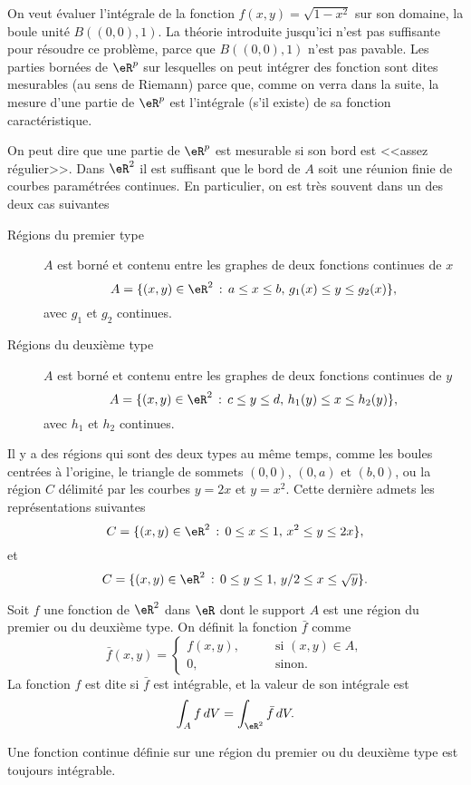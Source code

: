 On veut évaluer l'intégrale de la fonction $f(x,y)=\sqrt{1-x^2}$ sur son domaine, la boule unité $B((0,0),1)$. La théorie introduite jusqu'ici n'est pas suffisante pour résoudre  ce problème, parce que $B((0,0),1)$ n'est pas pavable. Les parties bornées de $\eR^p$ sur lesquelles on peut intégrer des fonction sont dites mesurables (au sens de Riemann) parce que, comme on verra dans la suite, la mesure d'une partie de $\eR^p$ est l'intégrale (s'il existe) de sa fonction caractéristique. 

On peut dire que une partie de $\eR^p$  est mesurable si son bord est <<assez régulier>>. Dans $\eR^2$ il est suffisant que le bord de $A$ soit une réunion finie de courbes paramétrées continues. En particulier, on est très souvent dans un des deux cas suivantes
\begin{description}
\item[Régions du premier type] $A$ est borné et contenu entre les graphes de deux fonctions continues de $x$
\[
A=\{(x,y)\in\eR^2 \,:\, a\leq x\leq b, \, g_1(x)\leq y\leq g_2(x)\}, 
\]
avec $g_1$ et $g_2$ continues. 
\item[Régions du deuxième type] $A$ est borné et contenu entre les graphes de deux fonctions continues de $y$
\[
A=\{(x,y)\in\eR^2 \,:\, c\leq y\leq d, \, h_1(y)\leq x\leq h_2(y)\}, 
\]
avec $h_1$ et $h_2$ continues.
\end{description}
\newcommand{\CaptionFigRegioniPrimoeSecondoTipo}{Régions du premier et du deuxième type}


\begin{example}
 Il y a des régions qui sont des deux types au même temps, comme les boules centrées à l'origine, le triangle de sommets  $(0,0)$, $(0,a)$ et $(b,0)$, ou la région $C$ délimité par les courbes $y=2x$ et $y=x^2$. Cette dernière admets les représentations suivantes
\[
C= \{(x,y)\in\eR^2 \,:\, 0\leq x\leq 1, \, x^2\leq y\leq 2x\},
\] 
et  
\[
C= \{(x,y)\in\eR^2 \,:\, 0\leq y\leq 1, \, y/2\leq x\leq \sqrt{y}\}.
\]  
\end{example}
\begin{definition}
  Soit $f$ une fonction de $\eR^2$ dans $\eR$ dont le support  $A$ est une région du premier ou du deuxième type. On définit la fonction $\bar f$ comme
 \begin{equation}
 \bar f(x,y) = \left\{ \begin{array}{ll}
     f(x,y), \qquad & \textrm{si } (x,y)\in A,\\
  0 , & \textrm{sinon.} 
    \end{array}\right.
  \end{equation}
  La fonction $f$ est dite  si $\bar f$ est intégrable, et la valeur de son intégrale est 
\[
\int_A f\, dV=\int_{\eR^2} \bar f\, dV.
\] 
\end{definition}
Une fonction continue définie sur une région du premier ou du deuxième type est toujours intégrable. 

